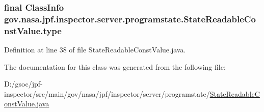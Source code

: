 \subsubsection[{\texorpdfstring{type}{type}}]{\setlength{\rightskip}{0pt plus 5cm}final Class\+Info gov.\+nasa.\+jpf.\+inspector.\+server.\+programstate.\+State\+Readable\+Const\+Value.\+type\hspace{0.3cm}{\ttfamily [private]}}\hypertarget{classgov_1_1nasa_1_1jpf_1_1inspector_1_1server_1_1programstate_1_1_state_readable_const_value_aecceaedabb6d497ea088f90bea912c5c}{}\label{classgov_1_1nasa_1_1jpf_1_1inspector_1_1server_1_1programstate_1_1_state_readable_const_value_aecceaedabb6d497ea088f90bea912c5c}


Definition at line 38 of file State\+Readable\+Const\+Value.\+java.



The documentation for this class was generated from the following file\+:\begin{DoxyCompactItemize}
\item 
D\+:/gsoc/jpf-\/inspector/src/main/gov/nasa/jpf/inspector/server/programstate/\hyperlink{_state_readable_const_value_8java}{State\+Readable\+Const\+Value.\+java}\end{DoxyCompactItemize}
